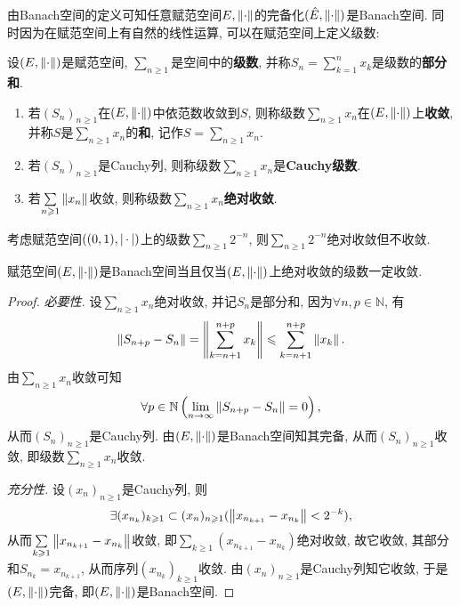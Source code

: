 	由Banach空间的定义可知任意赋范空间$ E,\left\| \cdot \right\| $的完备化$ (\hat{E},\left\| \cdot \right\|) $是Banach空间. 同时因为在赋范空间上有自然的线性运算, 可以在赋范空间上定义级数:
	
	\begin{Def}[级数]\label{def:级数}
	设$ (E,\left\| \cdot \right\|) $是赋范空间, $ \sum\limits_{n\geqslant 1} $是空间中的\textbf{级数}, 并称$ S_n=\sum\limits_{k=1}^nx_k $是级数的\textbf{部分和}.
	
	\begin{enumerate}[(1)]
	\item 若$ (S_n)_{n\geqslant 1} $在$ (E,\left\| \cdot \right\|) $中依范数收敛到$ S $, 则称级数$ \sum\limits_{n\geqslant 1}x_n $在$ (E,\left\| \cdot \right\|) $上\textbf{收敛}, 并称$ S $是$ \sum\limits_{n\geqslant 1}x_n $的\textbf{和}, 记作$ S=\sum\limits_{n\geqslant 1}x_n $.
	
	\item 若$ (S_n)_{n\geqslant 1} $是Cauchy列, 则称级数$ \sum\limits_{n\geqslant 1}x_n $是\textbf{Cauchy级数}.
	
	\item 若$ \sum\limits_{n\geqslant 1}\left\| x_n \right\| $收敛, 则称级数$ \sum\limits_{n\geqslant 1}x_n $\textbf{绝对收敛}.
	\end{enumerate}
	\end{Def}
	
	\begin{Rmk}
	考虑赋范空间$ ((0,1),\left| \,\cdot\, \right| ) $上的级数$ \sum\limits_{n\geqslant 1}2^{-n} $, 则$ \sum\limits_{n\geqslant 1}2^{-n} $绝对收敛但不收敛.
	\end{Rmk}
	
	\begin{Thm}
	赋范空间$ (E,\left\| \cdot \right\|) $是Banach空间当且仅当$ (E,\left\| \cdot \right\|) $上绝对收敛的级数一定收敛.
	\end{Thm}
	\begin{proof}
	\textsl{必要性.} 设$ \sum\limits_{n\geqslant 1}x_n $绝对收敛, 并记$ S_n $是部分和, 因为$ \forall n,p\in\mathbb{N} $, 有
	\[
	\left\| S_{n+p}-S_n \right\|=\left\| \sum_{k=n+1}^{n+p}x_k \right\|\leqslant\sum_{k=n+1}^{n+p}\left\| x_k \right\|.
	\]
	由$ \sum\limits_{n\geqslant 1}x_n $收敛可知
	\[
	\forall p\in\mathbb{N}\left(\lim_{n\to\infty}\left\| S_{n+p}-S_n \right\|=0\right),
	\]
	从而$ (S_n)_{n\geqslant 1} $是Cauchy列. 由$ (E,\left\| \cdot \right\|) $是Banach空间知其完备, 从而$ (S_n)_{n\geqslant 1} $收敛, 即级数$ \sum\limits_{n\geqslant 1}x_n $收敛.
	
	\textsl{充分性.} 设$ (x_n)_{n\geqslant 1} $是Cauchy列, 则
	\[
	\exists(x_{n_k})_{k\geqslant 1}\subset(x_n)_{n\geqslant 1}(\left\| x_{n_{k+1}}-x_{n_k} \right\|<2^{-k}),
	\]
	从而$ \sum\limits_{k\geqslant 1}\left\| x_{n_{k+1}}-x_{n_k} \right\| $收敛, 即$ \sum\limits_{k\geqslant 1}(x_{n_{k+1}}-x_{n_k}) $绝对收敛, 故它收敛, 其部分和$ S_{n_k}=x_{n_{k+1}} $, 从而序列$ (x_{n_k})_{k\geqslant 1} $收敛. 由$ (x_n)_{n\geqslant 1} $是Cauchy列知它收敛, 于是$ (E,\left\| \cdot \right\|) $完备, 即$ (E,\left\| \cdot \right\|) $是Banach空间.
	\end{proof}
	
	
	
	
	
	
	
	